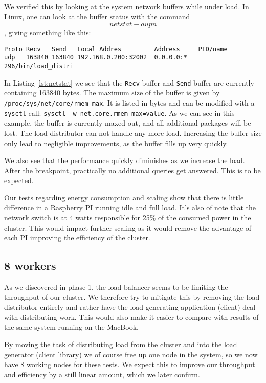 We verified this by looking at the system network buffers while under load. In Linux, one can look at the buffer status with the command $$netstat -aupn$$, giving something like this:
\begin{lstlisting}[caption={Output of {\tt netstat -aupn | grep 32002}},captionpos=b,label={lst:netstat}]
Proto Recv   Send   Local Addres         Address     PID/name
udp   163840 163840 192.168.0.200:32002  0.0.0.0:*   296/bin/load_distri
\end{lstlisting}
In Listing \ref{lst:netstat} we see that the {\tt Recv} buffer and {\tt Send} buffer are currently containing 163840 bytes.
The maximum size of the buffer is given by {\tt /proc/sys/net/core/rmem\_max}. It is listed in bytes and can be modified with a {\tt sysctl} call: {\tt sysctl -w net.core.rmem\_max=value}.
As we can see in this example, the buffer is currently maxed out, and all additional packages will be lost. The load distributor can not handle any more load. Increasing the buffer size only lead to negligible improvements, as the buffer fills up very quickly.

We also see that the performance quickly diminishes as we increase the load. After the breakpoint, practically no additional queries get answered.
This is to be expected.

Our tests regarding energy consumption and scaling show that there is little difference in a Raspberry PI running idle and full load.
It's also of note that the network switch is at 4 watts responsible for 25\% of the consumed power in the cluster.
This would impact further scaling as it would remove the advantage of each PI improving the efficiency of the cluster.

\subsection{8 workers}
As we discovered in phase 1, the load balancer seems to be limiting the throughput of our cluster.
We therefore try to mitigate this by removing the load distributor entirely and rather have the load generating application (client) deal with distributing work.
This would also make it easier to compare with results of the same system running on the MacBook.

By moving the task of distributing load from the cluster and into the load generator (client library) we of course free up one node in the system, so we now have 8 working nodes for these tests. We expect this to improve our throughput and efficiency by a still linear amount, which we later confirm.

